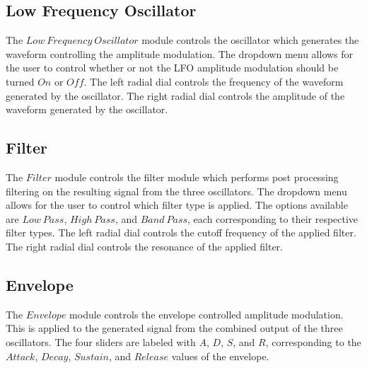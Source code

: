 \documentclass[a4paper,12pt]{report}
\begin{document}

\subsection{Low Frequency Oscillator}
\label{subsec:lfo}
The $Low\ Frequency\ Oscillator$ module controls the oscillator which generates the waveform controlling the amplitude modulation. The dropdown menu allows for the user to control whether or not the LFO amplitude modulation should be turned $On$ or $Off$. The left radial dial controls the frequency of the waveform generated by the oscillator. The right radial dial controls the amplitude of the waveform generated by the oscillator.


\subsection{Filter}
\label{subsec:filter}
The $Filter$ module controls the filter module which performs post processing filtering on the resulting signal from the three oscillators. The dropdown menu allows for the user to control which filter type is applied. The options available are $Low\ Pass$, $High\ Pass$, and $Band\ Pass$, each corresponding to their respective filter types. The left radial dial controls the cutoff frequency of the applied filter. The right radial dial controls the resonance of the applied filter.


\subsection{Envelope}
\label{subsec:env}
The $Envelope$ module controls the envelope controlled amplitude modulation. This is applied to the generated signal from the combined output of the three oscillators. The four sliders are labeled with $A$, $D$, $S$, and $R$, corresponding to the $Attack$, $Decay$, $Sustain$, and $Release$ values of the envelope.
\end{document}
